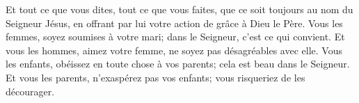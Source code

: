 Et tout ce que vous dites, tout ce que vous faites,
	que ce soit toujours au nom du Seigneur Jésus,
	en offrant par lui votre action de grâce à Dieu le Père.
Vous les femmes, soyez soumises à votre mari;
	dans le Seigneur, c’est ce qui convient.
Et vous les hommes, aimez votre femme,
	ne soyez pas désagréables avec elle.
Vous les enfants, obéissez en toute chose à vos parents;
	cela est beau dans le Seigneur.
Et vous les parents, n’exaspérez pas vos enfants;
	vous risqueriez de les décourager.
